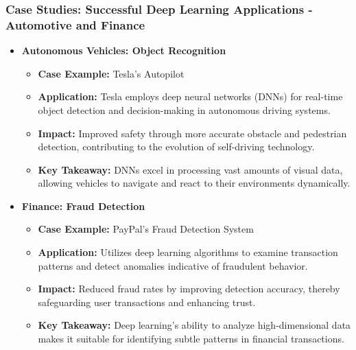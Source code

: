 \documentclass[aspectratio=169]{beamer}
\begin{document}
\begin{frame}[fragile]
    \frametitle{Case Studies: Successful Deep Learning Applications - Automotive and Finance}
    \begin{itemize}
        \item \textbf{Autonomous Vehicles: Object Recognition}
        \begin{itemize}
            \item \textbf{Case Example:} Tesla's Autopilot
            \item \textbf{Application:} 
            Tesla employs deep neural networks (DNNs) for real-time object detection and decision-making in autonomous driving systems.
            \item \textbf{Impact:} 
            Improved safety through more accurate obstacle and pedestrian detection, contributing to the evolution of self-driving technology.
            \item \textbf{Key Takeaway:} 
            DNNs excel in processing vast amounts of visual data, allowing vehicles to navigate and react to their environments dynamically.
        \end{itemize}
        
        \item \textbf{Finance: Fraud Detection}
        \begin{itemize}
            \item \textbf{Case Example:} PayPal's Fraud Detection System
            \item \textbf{Application:} 
            Utilizes deep learning algorithms to examine transaction patterns and detect anomalies indicative of fraudulent behavior.
            \item \textbf{Impact:} 
            Reduced fraud rates by improving detection accuracy, thereby safeguarding user transactions and enhancing trust.
            \item \textbf{Key Takeaway:} 
            Deep learning's ability to analyze high-dimensional data makes it suitable for identifying subtle patterns in financial transactions.
        \end{itemize}
    \end{itemize}
\end{frame}
\end{document}
